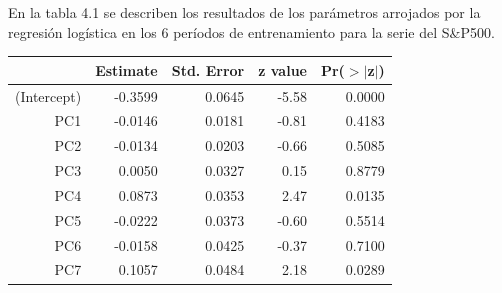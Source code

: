 \documentclass[a4paper,12pt]{Latex/Classes/PhDthesisPSnPDF}
\begin{document}
En la tabla 4.1 se describen los resultados de los parámetros arrojados por la regresión logística en los 6 períodos de entrenamiento para la serie del S\&P500.
\begin{center}
\begin{table}[ht]
\centering
\begin{tabular}{rrrrr}
  \hline
 & Estimate & Std. Error & z value & Pr($>$$|$z$|$) \\ 
  \hline
(Intercept) & -0.3599 & 0.0645 & -5.58 & 0.0000 \\ 
  PC1 & -0.0146 & 0.0181 & -0.81 & 0.4183 \\ 
  PC2 & -0.0134 & 0.0203 & -0.66 & 0.5085 \\ 
  PC3 & 0.0050 & 0.0327 & 0.15 & 0.8779 \\ 
  PC4 & 0.0873 & 0.0353 & 2.47 & 0.0135 \\ 
  PC5 & -0.0222 & 0.0373 & -0.60 & 0.5514 \\ 
  PC6 & -0.0158 & 0.0425 & -0.37 & 0.7100 \\ 
  PC7 & 0.1057 & 0.0484 & 2.18 & 0.0289 \\ 
   \hline
\end{tabular}
\end{table}\end{center}
\end{document}

